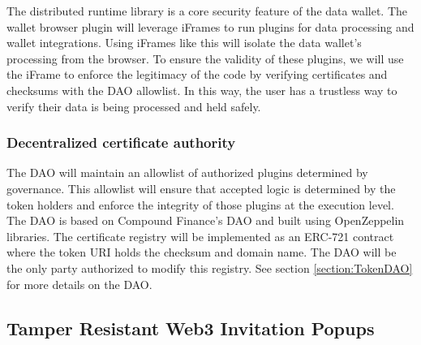 The distributed runtime library is a core security feature of the data wallet. The wallet browser plugin will leverage iFrames to run plugins for data 
processing and wallet integrations. Using iFrames like this will isolate the data wallet's processing from the browser. To ensure the validity of these 
plugins, we will use the iFrame to enforce the legitimacy of the code by verifying certificates and checksums with the DAO allowlist. In this way, the 
user has a trustless way to verify their data is being processed and held safely.

\subsubsection{Decentralized certificate authority}
\label{section:DAO}
The DAO will maintain an allowlist of authorized plugins determined by governance. This allowlist will ensure that accepted logic is determined by the token 
holders and enforce the integrity of those plugins at the execution level. The DAO is based on Compound Finance's DAO and built using OpenZeppelin libraries. 
The certificate registry will be implemented as an ERC-721 contract where the token URI holds the checksum and domain name. The DAO will be the only party 
authorized to modify this registry. See section \ref{section:TokenDAO} for more details on the DAO.

\subsection{Tamper Resistant Web3 Invitation Popups}
\label{section:Web3Popus}



